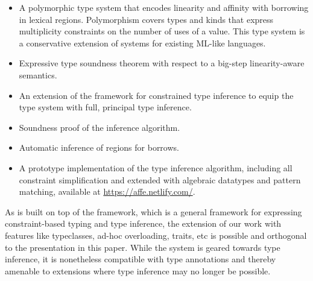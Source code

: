 \begin{itemize}
\item A polymorphic type system that encodes linearity and affinity with
  borrowing in lexical regions. Polymorphism covers types and kinds that
  express multiplicity constraints on the number of uses of a
  value. This type system is a conservative extension of systems for
  existing ML-like languages.
\item Expressive type soundness theorem with respect to a big-step linearity-aware semantics. 
\item An extension of the \hmx framework
  \cite{DBLP:journals/tapos/OderskySW99} for constrained type
  inference to equip the type system with full, principal type inference.
\item Soundness proof of the inference algorithm.
\item Automatic inference of regions for borrows.
\item A prototype implementation of the type inference algorithm, including all
  constraint simplification and extended with algebraic datatypes and
  pattern matching,
  available at \url{https://affe.netlify.com/}.
\end{itemize}

As \lang{} is built on top of the \hmx{} framework, which is a general
framework for expressing constraint-based typing and type inference,
the extension of our work with features like typeclasses, ad-hoc overloading,
traits, etc is possible and orthogonal to the presentation in this paper. 
While the system is geared towards type inference, it is nonetheless
compatible with type annotations and thereby amenable to extensions
where type inference may no longer be possible.

